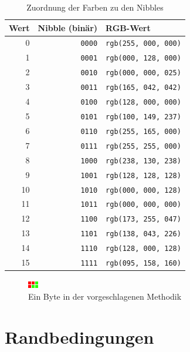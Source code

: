 \documentclass[11pt]{scrreprt} %
\theoremstyle{definition}
\begin{document}
\begin{table}
\caption{Zuordnung der Farben zu den Nibbles}
\label{tab:colormap}
\begin{center}
\begin{tabular}{rrl}
\toprule
Wert & Nibble (binär) & RGB-Wert \\
\midrule
0 & {\tt 0000} & {\tt rgb(255, 000, 000)} \\
1 & {\tt 0001} & {\tt rgb(000, 128, 000)} \\
2 & {\tt 0010} & {\tt rgb(000, 000, 025)} \\
3 & {\tt 0011} & {\tt rgb(165, 042, 042)} \\
4 & {\tt 0100} & {\tt rgb(128, 000, 000)} \\
5 & {\tt 0101} & {\tt rgb(100, 149, 237)} \\
6 & {\tt 0110} & {\tt rgb(255, 165, 000)} \\
7 & {\tt 0111} & {\tt rgb(255, 255, 000)} \\
8 & {\tt 1000} & {\tt rgb(238, 130, 238)} \\
9 & {\tt 1001} & {\tt rgb(128, 128, 128)} \\
10 & {\tt 1010} & {\tt rgb(000, 000, 128)} \\
11 & {\tt 1011} & {\tt rgb(000, 000, 000)} \\
12 & {\tt 1100} & {\tt rgb(173, 255, 047)} \\
13 & {\tt 1101} & {\tt rgb(138, 043, 226)} \\
14 & {\tt 1110} & {\tt rgb(128, 000, 128)} \\
15 & {\tt 1111} & {\tt rgb(095, 158, 160)} \\

\bottomrule
\end{tabular}
\end{center}
\end{table}


\begin{figure}
\caption{Ein Byte in der vorgeschlagenen Methodik}
\label{fig:onebyte}
\begin{center}
\includegraphics[scale=10]{biltli/onebyte.png}
\end{center}
\end{figure}


\chapter{Randbedingungen}
\end{document}
